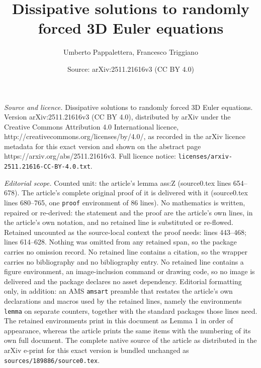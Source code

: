 \documentclass[10pt,a4paper]{amsart}
\title{Dissipative solutions to randomly forced 3D Euler equations}
\author{Umberto Pappalettera, Francesco Triggiano}
\date{Source: arXiv:2511.21616v3 (CC BY 4.0)}
\begin{document}
\maketitle

\noindent\emph{Source and licence.} Dissipative solutions to randomly forced 3D Euler equations. Version arXiv:2511.21616v3 (CC BY 4.0), distributed by arXiv under the Creative Commons Attribution 4.0 International licence, http://creativecommons.org/licenses/by/4.0/, as recorded in the arXiv licence metadata for this exact version and shown on the abstract page https://arxiv.org/abs/2511.21616v3. Full licence notice: \texttt{licenses/arxiv-2511.21616-CC-BY-4.0.txt}.\par\smallskip

\noindent\textit{Editorial scope.} Counted unit: the article's lemma ass:Z (source0.tex lines 654--678). The article's complete original proof of it is delivered with it (source0.tex lines 680--765, one \texttt{proof} environment of 86 lines). No mathematics is written, repaired or re-derived: the statement and the proof are the article's own lines, in the article's own notation, and no retained line is substituted or re-flowed.  Retained uncounted as the source-local context the proof needs: lines 443--468; lines 614--628.  Nothing was omitted from any retained span, so the package carries no omission record.  No retained line contains a citation, so the wrapper carries no bibliography and no bibliography entry.  No retained line contains a figure environment, an image-inclusion command or drawing code, so no image is delivered and the package declares no asset dependency.  Editorial formatting only, in addition: an AMS \texttt{amsart} preamble that restates the article's own declarations and macros used by the retained lines, namely the environments \texttt{lemma} on separate counters, together with the standard packages those lines need.  The retained environments print in this document as Lemma 1 in order of appearance, whereas the article prints the same items with the numbering of its own full document.  The complete native source of the article as distributed in the arXiv e-print for this exact version is bundled unchanged as \texttt{sources/189886/source0.tex}.
\end{document}
